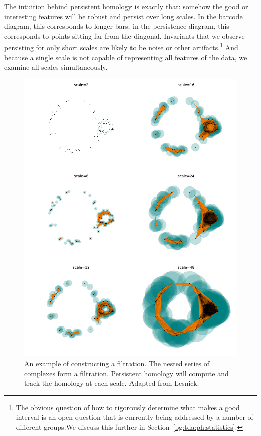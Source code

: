 The intuition behind persistent homology is exactly that: somehow the good or interesting features will be robust and persist over long scales.
In the barcode diagram, this corresponds to longer bars; in the persistence diagram, this corresponds to points sitting far from the diagonal.
Invariants that we observe persisting for only short scales are likely to be noise or other artifacts.\footnote{The obvious question of how to rigorously determine what makes a good interval is an open question that is currently being addressed by a number of different groups.We discuss this further in Section~\ref{bg:tda:ph:statistics}.}
And because a single scale is not capable of representing all features of the data, we examine all scales simultaneously.

\begin{figure}
\centering
\includegraphics[width=.8\textwidth]{./fig/background/expanding_balls.pdf}
\caption[Multiscale Topological Structure]{An example of constructing a filtration. The nested series of complexes form a filtration. Persistent homology will compute and track the homology at each scale. Adapted from Lesnick.}
\label{fig:bg:expanding_balls}
\end{figure}


